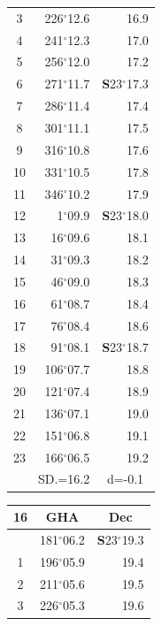 \documentclass[10pt, a4paper]{report}
\begin{document}
\begin{scriptsize}
\begin{tabular*}{0.2\textwidth}[t]{@{\extracolsep{\fill}}|c|rr|}
3 & 226$^\circ$12.6 & \raisebox{0.24ex}{\boldmath$\cdot$~\boldmath$\cdot$~~}16.9\\
4 & 241$^\circ$12.3 & 17.0\\
5 & 256$^\circ$12.0 & 17.2\\[2Pt]
6 & 271$^\circ$11.7 & \textbf{S}23$^\circ$17.3\\
7 & 286$^\circ$11.4 & 17.4\\
8 & 301$^\circ$11.1 & 17.5\\
9 & 316$^\circ$10.8 & \raisebox{0.24ex}{\boldmath$\cdot$~\boldmath$\cdot$~~}17.6\\
10 & 331$^\circ$10.5 & 17.8\\
11 & 346$^\circ$10.2 & 17.9\\[2Pt]
12 & 1$^\circ$09.9 & \textbf{S}23$^\circ$18.0\\
13 & 16$^\circ$09.6 & 18.1\\
14 & 31$^\circ$09.3 & 18.2\\
15 & 46$^\circ$09.0 & \raisebox{0.24ex}{\boldmath$\cdot$~\boldmath$\cdot$~~}18.3\\
16 & 61$^\circ$08.7 & 18.4\\
17 & 76$^\circ$08.4 & 18.6\\[2Pt]
18 & 91$^\circ$08.1 & \textbf{S}23$^\circ$18.7\\
19 & 106$^\circ$07.7 & 18.8\\
20 & 121$^\circ$07.4 & 18.9\\
21 & 136$^\circ$07.1 & \raisebox{0.24ex}{\boldmath$\cdot$~\boldmath$\cdot$~~}19.0\\
22 & 151$^\circ$06.8 & 19.1\\
23 & 166$^\circ$06.5 & 19.2\\
\hline
\rule{0pt}{2.4ex} & \multicolumn{1}{c}{SD.=16.2} & \multicolumn{1}{c|}{d=-0.1}\\
\hline
\end{tabular*}\noindent
\begin{tabular*}{0.2\textwidth}[t]{@{\extracolsep{\fill}}|c|rr|}
\hline
\multicolumn{1}{|c|}{\rule{0pt}{2.6ex}\textbf{16}} & \multicolumn{1}{c}{\textbf{GHA}} & \multicolumn{1}{c|}{\textbf{Dec}}\\
\hline\rule{0pt}{2.6ex}\noindent
0 & 181$^\circ$06.2 & \textbf{S}23$^\circ$19.3\\
1 & 196$^\circ$05.9 & 19.4\\
2 & 211$^\circ$05.6 & 19.5\\
3 & 226$^\circ$05.3 & \raisebox{0.24ex}{\boldmath$\cdot$~\boldmath$\cdot$~~}19.6\\

\end{tabular*}
\end{scriptsize}
\end{document}
